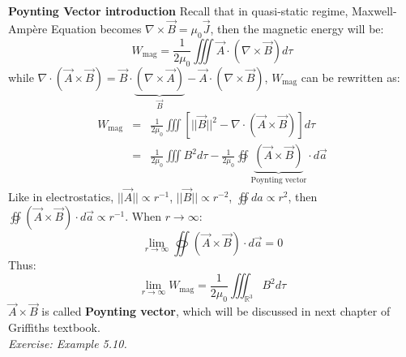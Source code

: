 \documentclass[12pt,a4paper,twoside]{article}
\numberwithin{equation}{section}
\begin{document}
\noindent\textbf{Poynting Vector introduction} Recall that in quasi-static regime, Maxwell-Amp\`ere Equation becomes $\nabla\times \overrightarrow{B}=\mu_0\overrightarrow{J}$, then the magnetic energy will be:
\[W_{\text{mag}}=\frac{1}{2\mu_0}\iiint\overrightarrow{A}\cdot(\nabla\times\overrightarrow{B})d\tau\]
while $\nabla \cdot(\overrightarrow{A}\times \overrightarrow{B})=\overrightarrow{B}\cdot \underbrace{(\nabla\times \overrightarrow{A})}_{\overrightarrow{B}}-\overrightarrow{A}\cdot(\nabla\times\overrightarrow{B})$, $W_\text{mag}$ can be rewritten as:
\begin{eqnarray*}
    W_{\text{mag}} &=& \frac{1}{2\mu_0}\iiint \left[||\overrightarrow{B}||^2-\nabla\cdot (\overrightarrow{A}\times \overrightarrow{B})\right]d\tau\\
    &=& \frac{1}{2\mu_0}\iiint B^2d\tau-\frac{1}{2\mu_0}\oiint \underbrace{(\overrightarrow{A}\times\overrightarrow{B})}_{\text{Poynting vector}} \cdot d\overrightarrow{a}
\end{eqnarray*}
Like in electrostatics, $||\overrightarrow{A}||\propto r^{-1}$, $||\overrightarrow{B}||\propto r^{-2}$, $\oiint da\propto r^2$, then $\oiint (\overrightarrow{A}\times\overrightarrow{B})\cdot d\overrightarrow{a}\propto r^{-1}$. When $r\to \infty$:
\[\lim_{r\to\infty}\oiint(\overrightarrow{A}\times\overrightarrow{B})\cdot d\overrightarrow{a}= 0\]
Thus:
\[\lim_{r\to\infty}W_{\text{mag}}=\frac{1}{2\mu_0}\iiint_{\mathbb{R}^3}B^2d\tau\]
$\overrightarrow{A}\times \overrightarrow{B}$ is called \textbf{Poynting vector}, which will be discussed in next chapter of Griffiths textbook.\\

\noindent \textit{Exercise: Example 5.10.} 
\end{document}
